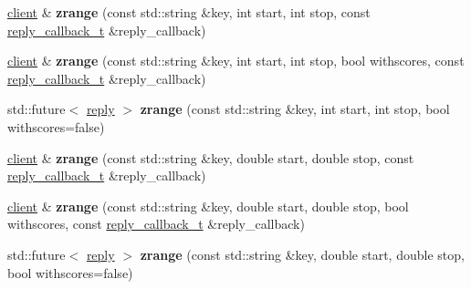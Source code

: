 \begin{DoxyCompactItemize}
\mbox{\label{classcpp__redis_1_1client_a70025f24f20e81397868467651c804a9}} 
\hyperlink{classcpp__redis_1_1client}{client} \& {\bfseries zrange} (const std\+::string \&key, int start, int stop, const \hyperlink{classcpp__redis_1_1client_a061a1140d36d2eaeda82b09a0bb3f9f2}{reply\+\_\+callback\+\_\+t} \&reply\+\_\+callback)
\item 
\mbox{\label{classcpp__redis_1_1client_a7a86805d2495c3866df9095ea71ab842}} 
\hyperlink{classcpp__redis_1_1client}{client} \& {\bfseries zrange} (const std\+::string \&key, int start, int stop, bool withscores, const \hyperlink{classcpp__redis_1_1client_a061a1140d36d2eaeda82b09a0bb3f9f2}{reply\+\_\+callback\+\_\+t} \&reply\+\_\+callback)
\item 
\mbox{\label{classcpp__redis_1_1client_a75f0e330b851c7bfcf373a7ef9f30cb8}} 
std\+::future$<$ \hyperlink{classcpp__redis_1_1reply}{reply} $>$ {\bfseries zrange} (const std\+::string \&key, int start, int stop, bool withscores=false)
\item 
\mbox{\label{classcpp__redis_1_1client_a24f15cede24bdb482167b1ea00db3160}} 
\hyperlink{classcpp__redis_1_1client}{client} \& {\bfseries zrange} (const std\+::string \&key, double start, double stop, const \hyperlink{classcpp__redis_1_1client_a061a1140d36d2eaeda82b09a0bb3f9f2}{reply\+\_\+callback\+\_\+t} \&reply\+\_\+callback)
\item 
\mbox{\label{classcpp__redis_1_1client_ab37fd922b733c5fa64f7a0dc4be22efe}} 
\hyperlink{classcpp__redis_1_1client}{client} \& {\bfseries zrange} (const std\+::string \&key, double start, double stop, bool withscores, const \hyperlink{classcpp__redis_1_1client_a061a1140d36d2eaeda82b09a0bb3f9f2}{reply\+\_\+callback\+\_\+t} \&reply\+\_\+callback)
\item 
\mbox{\label{classcpp__redis_1_1client_a0286a2953aeaec8c23d0e292fe2fccc2}} 
std\+::future$<$ \hyperlink{classcpp__redis_1_1reply}{reply} $>$ {\bfseries zrange} (const std\+::string \&key, double start, double stop, bool withscores=false)
\item 
\mbox{\label{classcpp__redis_1_1client_ad24c21a0344652d821d0628c68057ecb}} 

\end{DoxyCompactItemize}
